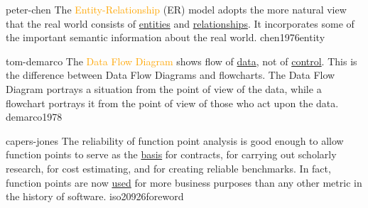 \documentclass{article}
\begin{document}

\lnQuote
  {peter-chen}
  {The \textcolor{orange}{Entity-Relationship} (ER) model adopts the more natural view that the real world consists of \ul{entities} and \ul{relationships}. It incorporates some of the important semantic information about the real world.}
  {chen1976entity}

\lnQuote
  {tom-demarco}
  {The \textcolor{orange}{Data Flow Diagram} shows flow of \ul{data}, not of \ul{control}. This is the difference between Data Flow Diagrams and flowcharts. The Data Flow Diagram portrays a situation from the point of view of the data, while a flowchart portrays it from the point of view of those who act upon the data.}
  {demarco1978}


\lnQuote
  {capers-jones}
  {The reliability of function point analysis is good enough to allow function points to serve as the \ul{basis} for contracts, for carrying out scholarly research, for cost estimating, and for creating reliable benchmarks. In fact, function points are now \ul{used} for more business purposes than any other metric in the history of software.}
  {iso20926foreword}

\end{document}

